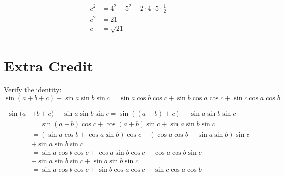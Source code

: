 \documentclass[fleqn,addpoints]{exam}
\begin{document}
\begin{questions}
\begin{solution}[4 cm]
\begin{align*}
  c^2 &= 4^2 - 5^2 - 2 \cdot 4 \cdot 5 \cdot \frac{1}{2} \\
  c^2 &= 21 \\
  c &= \sqrt{21} \\
\end{align*}
\end{solution}

\section{Extra Credit}
\bonusquestion[10]

Verify the identity:
\[
  \sin(a+b+c) + \sin a \sin b \sin c = \sin a \cos b \cos c + \sin b \cos a \cos c + \sin c \cos a \cos b  
\]

\begin{solution}[5 cm]
\begin{align*}
 \sin(a &+ b+c) + \sin a \sin b \sin c = \sin((a+b)+c) + \sin a \sin b \sin c \\
 &= \sin(a+b)\cos c + \cos(a+b)\sin c  + \sin a \sin b \sin c \\
 &= (\sin a \cos b + \cos a \sin b) \cos c + (\cos a \cos b - \sin a \sin b) \sin c \\
 &+ \sin a \sin b \sin c \\
 &= \sin a \cos b \cos c + \cos a \sin b \cos c + \cos a \cos b \sin c \\
 &- \sin a \sin b \sin c + \sin a \sin b \sin c \\
 &= \sin a \cos b \cos c + \sin b \cos a \cos c + \sin c \cos a \cos b \\
\end{align*}
\end{solution}

\end{questions}
\end{document}
